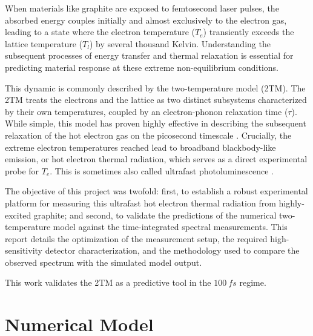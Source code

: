 \documentclass[
	a4paper,
]{scrarticle}
\begin{document}
When materials like graphite are exposed to femtosecond laser pulses, the absorbed energy couples initially and almost exclusively to the electron gas, leading to a state where the electron temperature ($T_e$) transiently exceeds the lattice temperature ($T_l$) by several thousand Kelvin. Understanding the subsequent processes of energy transfer and thermal relaxation is essential for predicting material response at these extreme non-equilibrium conditions.

This dynamic is commonly described by the two-temperature model (2TM). The 2TM treats the electrons and the lattice as two distinct subsystems characterized by their own temperatures, coupled by an electron-phonon relaxation time ($\tau$). While simple, this model has proven highly effective in describing the subsequent relaxation of the hot electron gas on the picosecond timescale \cite{stangeHotElectronCooling2015}. Crucially, the extreme electron temperatures reached lead to broadband blackbody-like emission, or hot electron thermal radiation, which serves as a direct experimental probe for $T_e$.
This is sometimes also called ultrafast photoluminescence \cite{luiUltrafastPhotoluminescenceGraphene2010}.

The objective of this project was twofold: first, to establish a robust experimental platform for measuring this ultrafast hot electron thermal radiation from highly-excited graphite; and second, to validate the predictions of the numerical two-temperature model against the time-integrated spectral measurements. This report details the optimization of the measurement setup, the required high-sensitivity detector characterization, and the methodology used to compare the observed spectrum with the simulated model output.

This work validates the 2TM as a predictive tool in the $\SI{100}{fs}$ regime.

\section{Numerical Model}
\end{document}
